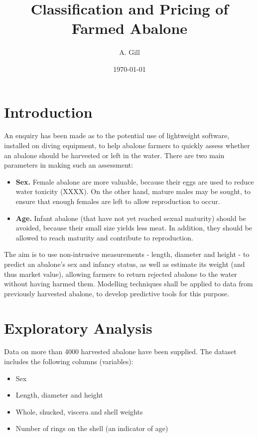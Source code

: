 \documentclass[11pt, a4paper]{article}
\title{\large\bfseries Classification and Pricing of Farmed Abalone}
\author{\normalsize A. Gill}
\date{\small \today}
\begin{document}
    
    \maketitle

    \section*{Introduction}    
      
    An enquiry has been made as to the potential use of lightweight software, installed on diving equipment, to help abalone farmers to quickly assess whether an abalone should be harvested or left in the water. There are two main parameters in making such an assessment:

    \begin{itemize}
        \item \textbf{Sex.} Female abalone are more valuable, because their eggs are used to reduce water toxicity (XXXX). On the other hand, mature males may be sought, to ensure that enough females are left to allow reproduction to occur.
        \item \textbf{Age.} Infant abalone (that have not yet reached sexual maturity) should be avoided, because their small size yields less meat. In addition, they should be allowed to reach maturity and contribute to reproduction.
    \end{itemize} 

    The aim is to use non-intrusive measurements - length, diameter and height - to predict an abalone's sex and infancy status, as well as estimate its weight (and thus market value), allowing farmers to return rejected abalone to the water without having harmed them. Modelling techniques shall be applied to data from previously harvested abalone, to develop predictive tools for this purpose.

    \section{Exploratory Analysis}

    Data on more than 4000 harvested abalone have been supplied. The dataset includes the following columns (variables):

    \begin{itemize}
        \item Sex
        \item Length, diameter and height
        \item Whole, shucked, viscera and shell weights
        \item Number of rings on the shell (an indicator of age)
    \end{itemize}
\end{document}
